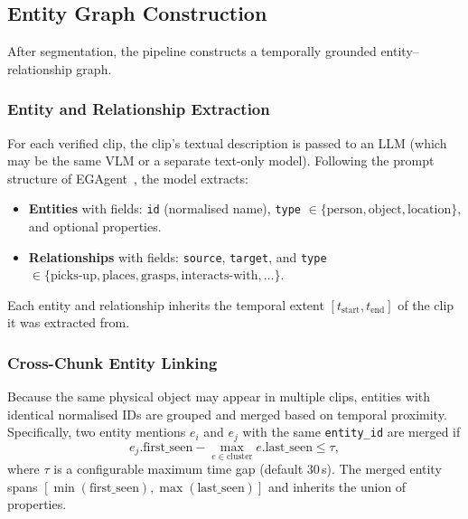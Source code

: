 \documentclass[10pt,twocolumn]{article}
\begin{document}
\subsection{Entity Graph Construction}\label{sec:entity-graph}

After segmentation, the pipeline constructs a temporally grounded
entity--relationship graph.

\subsubsection{Entity and Relationship Extraction}

For each verified clip, the clip's textual description is passed to
an LLM (which may be the same VLM or a separate text-only model).
Following the prompt structure of EGAgent~\cite{xu2025egagent},
the model extracts:
\begin{itemize}[leftmargin=*,itemsep=1pt]
  \item \textbf{Entities} with fields: \texttt{id} (normalised
    name), \texttt{type} $\in \{\text{person}, \text{object},
    \text{location}\}$, and optional properties.
  \item \textbf{Relationships} with fields: \texttt{source},
    \texttt{target}, and \texttt{type} $\in \{\text{picks-up},
    \text{places}, \text{grasps}, \text{interacts-with},
    \ldots\}$.
\end{itemize}
Each entity and relationship inherits the temporal extent
$[t_{\text{start}}, t_{\text{end}}]$ of the clip it was extracted
from.

\subsubsection{Cross-Chunk Entity Linking}

Because the same physical object may appear in multiple clips,
entities with identical normalised IDs are grouped and merged based
on temporal proximity.  Specifically, two entity mentions $e_i$ and
$e_j$ with the same \texttt{entity\_id} are merged if
\begin{equation}
  e_j.\text{first\_seen} - \max_{e \in \text{cluster}}
    e.\text{last\_seen} \leq \tau,
\end{equation}
where $\tau$ is a configurable maximum time gap (default 30\,s).
The merged entity spans $[\min(\text{first\_seen}),
\max(\text{last\_seen})]$ and inherits the union of properties.
\end{document}
